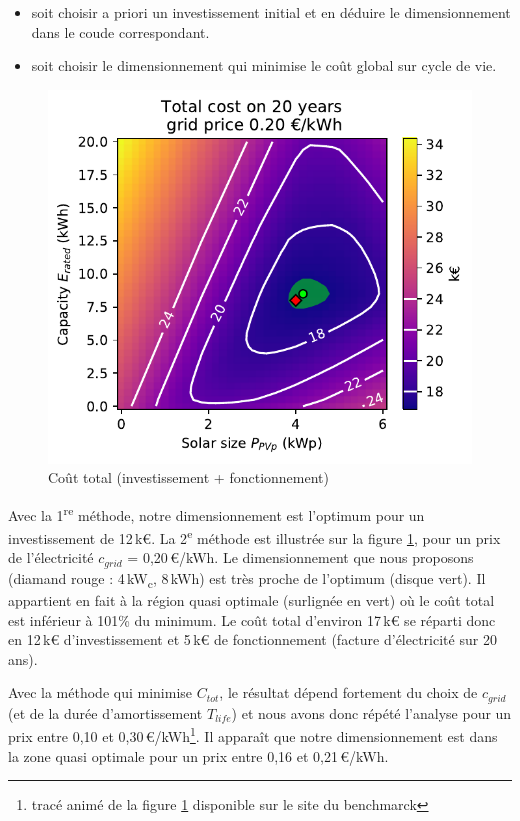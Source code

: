 \documentclass[a4paper,10pt,twocolumn]{article}
\newcommand\tsp[1]{\textsuperscript{#1}}
\newcommand\sub[1]{\textsubscript{#1}}
\begin{document}
\begin{itemize}
 \item soit choisir a priori un investissement initial et en déduire le dimensionnement
 dans le coude correspondant.
 \item soit choisir le dimensionnement qui minimise le coût global sur cycle de vie.
\end{itemize}

\begin{figure}[!ht]
  \begin{center}
	  \includegraphics[width=0.8\columnwidth]{figures/Total_cost_map_grid020.pdf}
  \end{center}

  \caption{Coût total (investissement + fonctionnement)
  }
  \label{fig:cost_tot}
\end{figure}

Avec la 1\tsp{re} méthode, notre dimensionnement est l'optimum
pour un investissement de 12\,k€.
La 2\tsp{e} méthode est illustrée sur la figure \ref{fig:cost_tot},
pour un prix de l'électricité $c_{grid}$ = 0,20\,€/kWh.
Le dimensionnement que nous proposons (diamand rouge : 4\,kW\sub{c}, 8\,kWh)
est très proche de l'optimum (disque vert).
Il appartient en fait à la région quasi optimale (surlignée en vert)
où le coût total est inférieur à 101\% du minimum.
Le coût total d'environ 17\,k€ se réparti donc en 12\,k€ d'investissement
et 5\,k€ de fonctionnement (facture d'électricité sur 20 ans).

Avec la méthode qui minimise $C_{tot}$,
le résultat dépend fortement du choix de $c_{grid}$
(et de la durée d'amortissement $T_{life}$)
et nous avons donc répété l'analyse pour un prix entre 0,10 et 0,30\,€/kWh\footnote{%
  tracé animé de la figure \ref{fig:cost_tot} disponible sur le site du benchmarck}.
Il apparaît que notre dimensionnement est dans la zone quasi optimale pour un prix
entre 0,16 et 0,21\,€/kWh.
\end{document}
